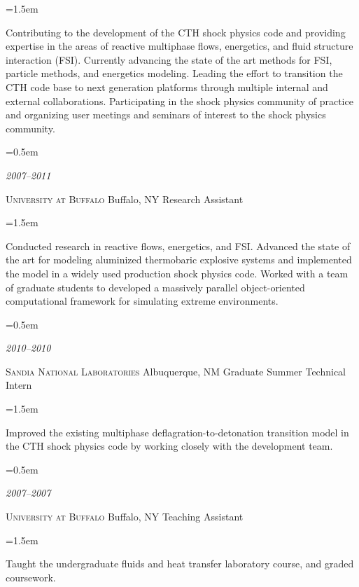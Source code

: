 \documentclass{scrartcl}
\newcommand{\MarginText}[1]{\marginpar{\raggedleft\itshape\small#1}} %
\newlength{\datebox}\settowidth{\datebox}{Spring 2011} %
\newcommand{\NewJob}[4]{\noindent\hangindent=0.5em\hangafter=0 \parbox{\datebox}{\small \textit{#1}}\hspace{1em} #2 \hfill #4 \newline #3 %
\vspace{0.5em}} %
\newcommand{\Description}[1]{\hangindent=1.5em\hangafter=0\noindent\raggedright\footnotesize{#1}\par\normalsize\vspace{0.75em}} %
\begin{document}
\begin{cv}{}
\Description{\justifying Contributing to the development of the CTH shock physics code and providing expertise in the areas of reactive multiphase flows, energetics, and fluid structure interaction (FSI). Currently advancing the state of the art methods for FSI, particle methods, and energetics modeling. Leading the effort to transition the CTH code base to next generation platforms through multiple internal and external collaborations. Participating in the shock physics community of practice and organizing user meetings and seminars of interest to the shock physics community.\par}

\NewJob{2007--2011}{\textsc{University at Buffalo}}{Research Assistant}{Buffalo, NY}

\Description{\justifying Conducted research in reactive flows, energetics, and FSI.  Advanced the state of the art for modeling aluminized thermobaric explosive systems and implemented the model in a widely used production shock physics code.  Worked with a team of graduate students to developed a massively parallel object-oriented computational framework for simulating extreme environments.\par}

\NewJob{2010--2010}{\textsc{Sandia National Laboratories}}{Graduate Summer Technical Intern}{Albuquerque, NM}

\Description{Improved the existing multiphase deflagration-to-detonation transition model in the CTH shock physics code by working closely with the development team. }

\NewJob{2007--2007}{\textsc{University at Buffalo}}{Teaching Assistant}{Buffalo, NY}

\Description{\justifying Taught the undergraduate fluids and heat transfer laboratory course, and graded coursework.\par}


\end{cv}
\end{document}
